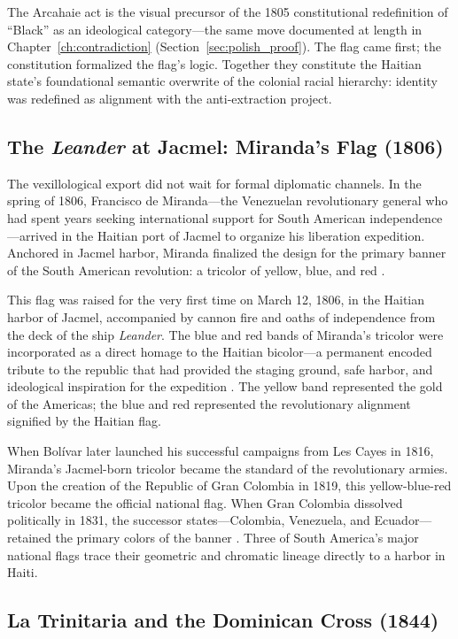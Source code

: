 The Arcahaie act is the visual precursor of the 1805 constitutional redefinition of ``Black'' as an ideological category---the same move documented at length in Chapter~\ref{ch:contradiction} (Section~\ref{sec:polish_proof}). The flag came first; the constitution formalized the flag's logic. Together they constitute the Haitian state's foundational semantic overwrite of the colonial racial hierarchy: identity was redefined as alignment with the anti-extraction project.

\subsection{The \textit{Leander} at Jacmel: Miranda's Flag (1806)}

The vexillological export did not wait for formal diplomatic channels. In the spring of 1806, Francisco de Miranda---the Venezuelan revolutionary general who had spent years seeking international support for South American independence---arrived in the Haitian port of Jacmel to organize his liberation expedition. Anchored in Jacmel harbor, Miranda finalized the design for the primary banner of the South American revolution: a tricolor of yellow, blue, and red \cite{miranda_jacmel_1806}.

This flag was raised for the very first time on March 12, 1806, in the Haitian harbor of Jacmel, accompanied by cannon fire and oaths of independence from the deck of the ship \textit{Leander}. The blue and red bands of Miranda's tricolor were incorporated as a direct homage to the Haitian bicolor---a permanent encoded tribute to the republic that had provided the staging ground, safe harbor, and ideological inspiration for the expedition \cite{miranda_jacmel_1806}. The yellow band represented the gold of the Americas; the blue and red represented the revolutionary alignment signified by the Haitian flag.

When Bolívar later launched his successful campaigns from Les Cayes in 1816, Miranda's Jacmel-born tricolor became the standard of the revolutionary armies. Upon the creation of the Republic of Gran Colombia in 1819, this yellow-blue-red tricolor became the official national flag. When Gran Colombia dissolved politically in 1831, the successor states---Colombia, Venezuela, and Ecuador---retained the primary colors of the banner \cite{miranda_jacmel_1806}. Three of South America's major national flags trace their geometric and chromatic lineage directly to a harbor in Haiti.

\subsection{La Trinitaria and the Dominican Cross (1844)}

